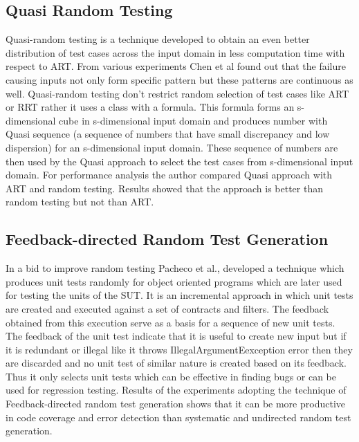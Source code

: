 \subsection{Quasi Random Testing}
Quasi-random testing \cite{Chen2005} is a technique developed to obtain an even better distribution of test cases across the input domain in less computation time with respect to ART. From various experiments Chen et al found out that the failure causing inputs not only form specific pattern but these patterns are continuous as well. Quasi-random testing don't restrict random selection of test cases like ART or RRT rather it uses a class with a formula. This formula forms an s-dimensional cube in s-dimensional input domain and produces number with Quasi sequence (a sequence of numbers that have small discrepancy and low dispersion) for an s-dimensional input domain. These sequence of numbers are then used by the Quasi approach to select the test cases from s-dimensional input domain. For performance analysis the author compared Quasi approach with ART and random testing. Results showed that the approach is better than random testing but not than ART.



\subsection{Feedback-directed Random Test Generation}
In a bid to improve random testing Pacheco et al., \cite{Pacheco2007} developed a technique which produces unit tests randomly for object oriented programs which are later used for testing the units of the SUT. It is an incremental approach in which unit tests are created and executed against a set of contracts and filters. The feedback obtained from this execution serve as a basis for a sequence of new unit tests. The feedback of the unit test indicate that it is useful to create new input but if it is redundant or illegal like it throws IllegalArgumentEexception error then they are discarded and no unit test of similar nature is created based on its feedback. Thus it only selects unit tests which can be effective in finding bugs or can be used for regression testing.
Results of the experiments adopting the technique of Feedback-directed random test generation shows that it can be more productive in code coverage and error detection than systematic and undirected random test generation.

